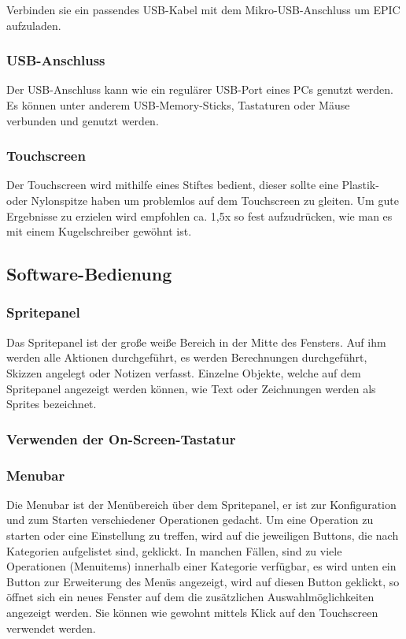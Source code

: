 Verbinden sie ein passendes USB-Kabel mit dem Mikro-USB-Anschluss um EPIC aufzuladen. 

\subsubsection{USB-Anschluss}

Der USB-Anschluss kann wie ein regulärer USB-Port eines PCs genutzt werden. Es können unter anderem USB-Memory-Sticks, Tastaturen oder Mäuse verbunden und genutzt werden.

\subsubsection{Touchscreen}

Der Touchscreen wird mithilfe eines Stiftes bedient, dieser sollte eine Plastik- oder Nylonspitze haben um problemlos auf dem Touchscreen zu gleiten. Um gute Ergebnisse zu erzielen wird empfohlen ca. 1,5x so fest aufzudrücken, wie man es mit einem Kugelschreiber gewöhnt ist. 

\subsection{Software-Bedienung}

\subsubsection{Spritepanel}
Das Spritepanel ist der große weiße Bereich in der Mitte des Fensters. Auf ihm werden alle Aktionen durchgeführt, es werden Berechnungen durchgeführt, Skizzen angelegt oder Notizen verfasst. Einzelne Objekte, welche auf dem Spritepanel angezeigt werden können, wie Text oder Zeichnungen werden als Sprites bezeichnet.

\subsubsection{Verwenden der On-Screen-Tastatur}

\subsubsection{Menubar}

Die Menubar ist der Menübereich über dem Spritepanel, er ist zur Konfiguration und zum Starten verschiedener Operationen gedacht. Um eine Operation zu starten oder eine Einstellung zu treffen, wird auf die jeweiligen Buttons, die nach Kategorien aufgelistet sind, geklickt. In manchen Fällen, sind zu viele Operationen (Menuitems) innerhalb einer Kategorie verfügbar, es wird unten ein Button zur Erweiterung des Menüs angezeigt, wird auf diesen Button geklickt, so öffnet sich ein neues Fenster auf dem die zusätzlichen Auswahlmöglichkeiten angezeigt werden. Sie können wie gewohnt mittels Klick auf den Touchscreen verwendet werden.

